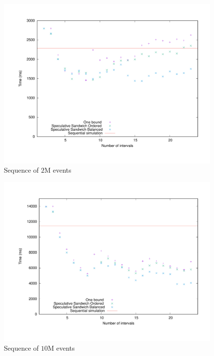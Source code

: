 \documentclass[a4paper,10pt]{article}
\begin{document}
\begin{figure}[]
        \begin{center}
      \includegraphics[scale=0.4]{time_mid.pdf}

      \caption{Sequence of $2$M events}    \label{fig:mid_time}
      \end{center} 
\end{figure}
\begin{figure}[]
        \begin{center}
      \includegraphics[scale=0.4]{time_long.pdf}
      \caption{Sequence of $10$M events}    \label{fig:long_time}
      \end{center} 
\end{figure}
  
\end{document}
